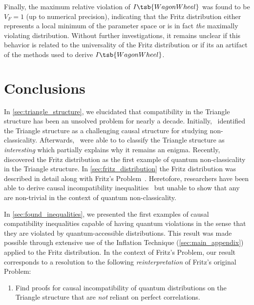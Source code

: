 \documentclass[aps, 10pt, english, twoside, pra, nofootinbib, tightenlines, longbibliography, superscriptaddress]{revtex4-1}
\begin{document}
    Finally, the maximum relative violation of $I\tsb{WagonWheel}$ was found to be $V_F = 1$ (up to numerical precision), indicating that the Fritz distribution either represents a local minimum of the parameter space or is in fact \textit{the} maximally violating distribution. Without further investigations, it remains unclear if this behavior is related to the universality of the Fritz distribution or if its an artifact of the methods used to derive $I\tsb{WagonWheel}$.

    \section{Conclusions}
    \label{sec:conclusions}
    In \cref{sec:triangle_structure}, we elucidated that compatibility in the Triangle structure has been an unsolved problem for nearly a decade. Initially,~\citet{Branciard_2012} identified the Triangle structure as a challenging causal structure for studying non-classicality. Afterwards,~\citet{Henson_2014} were able to to classify the Triangle structure as \textit{interesting} which partially explains why it remains an enigma. Recently,~\citet{Fritz_2012} discovered the Fritz distribution as the first example of quantum non-classicality in the Triangle structure. In \cref{sec:fritz_distribution} the Fritz distribution was described in detail along with Fritz's Problem~\cite[Problem 2.17]{Fritz_2012}. Heretofore, researchers have been able to derive causal incompatibility inequalities~\cite{Inflation,Steudel_2010,Henson_2014} but unable to show that any are non-trivial in the context of quantum non-classicality.

    In \cref{sec:found_inequalities}, we presented the first examples of causal compatibility inequalities capable of having quantum violations in the sense that they are violated by quantum-accessible distributions. This result was made possible through extensive use of the Inflation Technique (\cref{sec:main_appendix}) applied to the Fritz distribution. In the context of Fritz's Problem, our result corresponds to a resolution to the following \textit{reinterpretation} of Fritz's original Problem:
    \begin{enumerate}[label=\textbf{FP.\Alph*}]
        \setcounter{enumi}{0}
        \item \label{r:1} Find proofs for causal incompatibility of quantum distributions on the Triangle structure that are \textit{not} reliant on perfect correlations.
    \end{enumerate}
\end{document}
